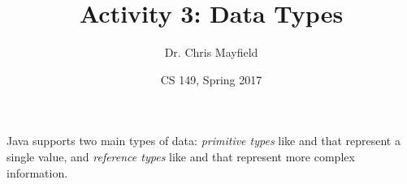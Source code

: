 \documentclass[12pt]{article}
\title{Activity 3: Data Types}
\author{Dr. Chris Mayfield}
\date{CS 149, Spring 2017}
\begin{document}
\maketitle

Java supports two main types of data: \emph{primitive types} like  and  that represent a single value, and \emph{reference types} like  and  that represent more complex information.




\end{document}
